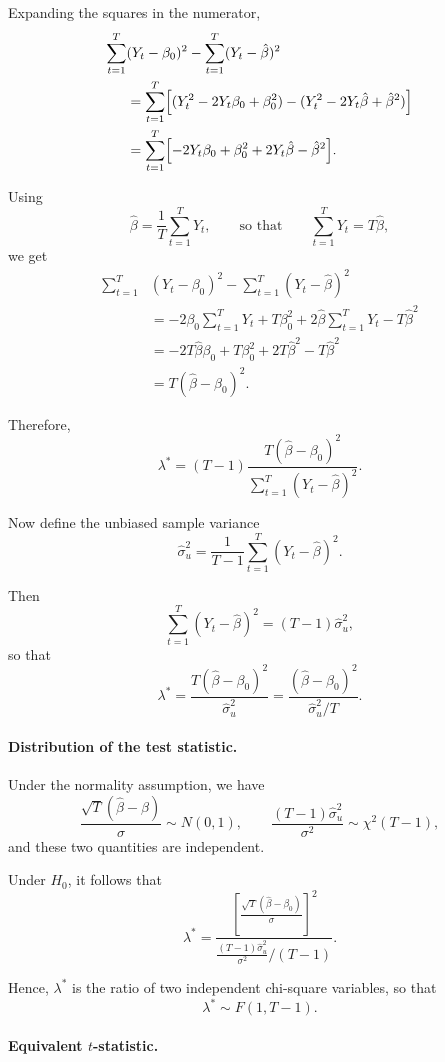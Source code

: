 Expanding the squares in the numerator,
\begin{align*}
\sum_{t=1}^T 
&(Y_t-\beta_0)^2
-
\sum_{t=1}^T (Y_t-\hat{\beta})^2\\
&=
\sum_{t=1}^T
\Bigl[
(Y_t^2 - 2Y_t\beta_0 + \beta_0^2)
-
(Y_t^2 - 2Y_t\hat{\beta} + \hat{\beta}^2)
\Bigr] \\
&=
\sum_{t=1}^T
\Bigl[
-2Y_t\beta_0 + \beta_0^2 + 2Y_t\hat{\beta} - \hat{\beta}^2
\Bigr].
\end{align*}

Using
\[
\hat{\beta}=\frac{1}{T}\sum_{t=1}^T Y_t,
\qquad\text{so that}\qquad
\sum_{t=1}^T Y_t = T\hat{\beta},
\]
we get
\begin{align*}
\sum_{t=1}^T 
&(Y_t-\beta_0)^2
-
\sum_{t=1}^T (Y_t-\hat{\beta})^2\\
&=
-2\beta_0 \sum_{t=1}^T Y_t
+ T\beta_0^2
+ 2\hat{\beta}\sum_{t=1}^T Y_t
- T\hat{\beta}^2 \\
&=
-2T\hat{\beta}\beta_0
+ T\beta_0^2
+ 2T\hat{\beta}^2
- T\hat{\beta}^2 \\
&=
T(\hat{\beta}-\beta_0)^2.
\end{align*}

Therefore,
\[
\lambda^*
=
(T-1)\frac{T(\hat{\beta}-\beta_0)^2}{\sum_{t=1}^T (Y_t-\hat{\beta})^2}.
\]

Now define the unbiased sample variance
\[
\hat{\sigma}_u^2
=
\frac{1}{T-1}\sum_{t=1}^T (Y_t-\hat{\beta})^2.
\]

Then
\[
\sum_{t=1}^T (Y_t-\hat{\beta})^2
=
(T-1)\hat{\sigma}_u^2,
\]
so that
\[
\lambda^*
=
\frac{T(\hat{\beta}-\beta_0)^2}{\hat{\sigma}_u^2}
=
\frac{(\hat{\beta}-\beta_0)^2}{\hat{\sigma}_u^2/T}.
\]

\paragraph{Distribution of the test statistic.}

Under the normality assumption, we have
\[
\frac{\sqrt{T}(\hat{\beta}-\beta)}{\sigma}
\sim N(0,1),
\qquad
\frac{(T-1)\hat{\sigma}_u^2}{\sigma^2}
\sim \chi^2(T-1),
\]
and these two quantities are independent.

Under $H_0$, it follows that
\[
\lambda^*
=
\frac{\left[\frac{\sqrt{T}(\hat{\beta}-\beta_0)}{\sigma}\right]^2}
{\frac{(T-1)\hat{\sigma}_u^2}{\sigma^2}/(T-1)}.
\]

Hence, $\lambda^*$ is the ratio of two independent chi-square variables,
so that
\[
\lambda^* \sim F(1,T-1).
\]

\paragraph{Equivalent $t$-statistic.}

